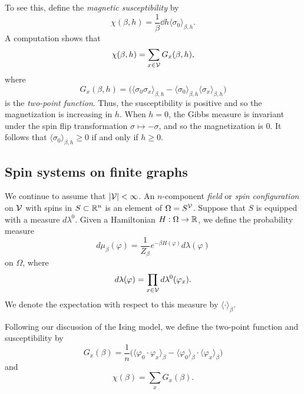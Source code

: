 To see this, define the \emph{magnetic susceptibility} by
\begin{equation}
\chi(\beta, h)
	=
\frac{1}{\beta} \dd{}{h} \langle \sigma_0 \rangle_{\beta,h}.
\end{equation}
A computation shows that
\begin{equation}
\chi(\beta, h) = \sum_{x\in\mathcal{V}} G_x(\beta, h),
\end{equation}
where
\begin{equation}
G_x(\beta, h)
	=
\Big(
	\langle \sigma_0 \sigma_x \rangle_{\beta,h}
		-
	\langle \sigma_0 \rangle_{\beta,h} \langle \sigma_x \rangle_{\beta,h}
\Big)
\end{equation}
is the \emph{two-point function}.
Thus, the susceptibility is positive and so the magnetization is increasing
in $h$. When $h = 0$, the Gibbs measure is invariant under the spin flip transformation
$\sigma \mapsto -\sigma$, and so the magnetization is $0$. It follows that
$\langle \sigma_0 \rangle_{\beta,h} \ge 0$ if and only if $h \ge 0$.


\subsection{Spin systems on finite graphs}

We continue to assume that $|\mathcal{V}| < \infty$.
An $n$-component \emph{field} or \emph{spin configuration} on $\mathcal{V}$
with spins in $S \subset {\mathbb R}^n$ is an element of $\Omega = S^{\mathcal{V}}$.
Suppose that $S$ is equipped with a measure $d\lambda^0$.
Given a Hamiltonian $H : \Omega \rightarrow {\mathbb R}$, we define the probability measure
\begin{equation}
\label{e:gibbs-spin}
d\mu_\beta(\varphi)
  =
\frac{1}{Z_\beta} e^{-\beta H(\varphi)} d\lambda(\varphi)
\end{equation}
on $\Omega$, where
\begin{equation}
d\lambda(\varphi) = \prod_{x\in\mathcal{V}} d\lambda^0(\varphi_x).
\end{equation}
We denote the expectation with respect to this measure by $\langle\cdot\rangle_\beta$.



Following our discussion of the Ising model, we define the two-point function
and susceptibility by
\begin{equation}
G_x(\beta)
  =
\frac{1}{n}
\big(\langle \varphi_0 \cdot \varphi_x \rangle_\beta
  -
\langle \varphi_0 \rangle_\beta \cdot \langle \varphi_x \rangle_\beta\big)
\end{equation}
and
\begin{equation}
\chi(\beta) = \sum_x G_x(\beta).
\end{equation}

